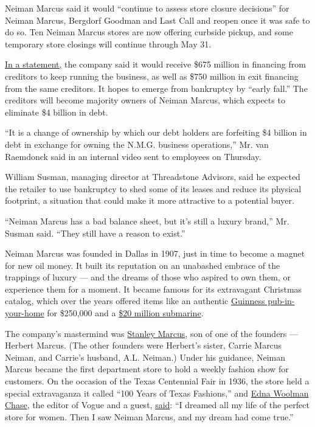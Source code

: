 Neiman Marcus said it would ``continue to assess store closure
decisions'' for Neiman Marcus, Bergdorf Goodman and Last Call and reopen
once it was safe to do so. Ten Neiman Marcus stores are now offering
curbside pickup, and some temporary store closings will continue through
May 31.

\href{https://cases.stretto.com/public/X064/10214/faqs/0914eddd-2efd-43c3-a078-9a830cf641da.pdf}{In
a statement,} the company said it would receive \$675 million in
financing from creditors to keep running the business, as well as \$750
million in exit financing from the same creditors. It hopes to emerge
from bankruptcy by ``early fall.'' The creditors will become majority
owners of Neiman Marcus, which expects to eliminate \$4 billion in debt.

``It is a change of ownership by which our debt holders are forfeiting
\$4 billion in debt in exchange for owning the N.M.G. business
operations,'' Mr. van Raemdonck said in an internal video sent to
employees on Thursday.

William Susman, managing director at Threadstone Advisors, said he
expected the retailer to use bankruptcy to shed some of its leases and
reduce its physical footprint, a situation that could make it more
attractive to a potential buyer.

``Neiman Marcus has a bad balance sheet, but it's still a luxury
brand,'' Mr. Susman said. ``They still have a reason to exist.''

Neiman Marcus was founded in Dallas in 1907, just in time to become a
magnet for new oil money. It built its reputation on an unabashed
embrace of the trappings of luxury --- and the dreams of those who
aspired to own them, or experience them for a moment. It became famous
for its extravagant Christmas catalog, which over the years offered
items like an authentic
\href{https://www.trendhunter.com/trends/250000-home-pub-mark-guinness-250th-birthday-in-style}{Guinness
pub-in-your-home} for \$250,000 and a
\href{https://www.nytimes3xbfgragh.onion/2000/10/29/business/responsible-party-karen-katz-submarines-for-sale-one-size-fits-all.html}{\$20
million submarine}.

The company's mastermind was
\href{https://www.nytimes3xbfgragh.onion/2016/12/01/t-magazine/fashion/neiman-marcus-history-dallas-texas.html}{Stanley
Marcus}, son of one of the founders --- Herbert Marcus. (The other
founders were Herbert's sister, Carrie Marcus Neiman, and Carrie's
husband, A.L. Neiman.) Under his guidance, Neiman Marcus became the
first department store to hold a weekly fashion show for customers. On
the occasion of the Texas Centennial Fair in 1936, the store held a
special extravaganza it called ``100 Years of Texas Fashions,'' and
\href{https://www.nytimes3xbfgragh.onion/1957/03/21/archives/edna-woolman-chase-dies-at-80-retired-vogue-magazine-editor-fashion.html}{Edna
Woolman Chase}, the editor of Vogue and a guest,
\href{https://www.commentarymagazine.com/articles/william-schack/neiman-marcus-of-texascouture-and-culture/}{said}:
``I dreamed all my life of the perfect store for women. Then I saw
Neiman Marcus, and my dream had come true.''


